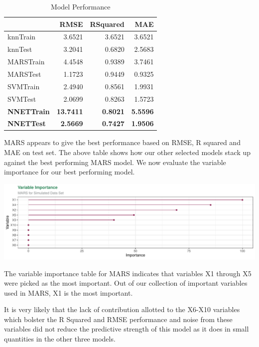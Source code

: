 \documentclass[]{report}
\begin{document}
\begin{table}[H]

\caption{\label{tab:unnamed-chunk-1}Model Performance}
\centering
\begin{tabular}[t]{l|r|r|r}
\hline
\textbf{ } & \textbf{RMSE} & \textbf{RSquared} & \textbf{MAE}\\
\hline
\rowcolor{gray!6}  knnTrain & 3.6521 & 3.6521 & 3.6521\\
\hline
knnTest & 3.2041 & 0.6820 & 2.5683\\
\hline
\rowcolor{gray!6}  MARSTrain & 4.4548 & 0.9389 & 3.7461\\
\hline
MARSTest & 1.1723 & 0.9449 & 0.9325\\
\hline
\rowcolor{gray!6}  SVMTrain & 2.4940 & 0.8561 & 1.9931\\
\hline
SVMTest & 2.0699 & 0.8263 & 1.5723\\
\hline
\rowcolor{gray!6}  \rowcolor[HTML]{d9f2e6}  \textbf{NNETTrain} & \textbf{13.7411} & \textbf{0.8021} & \textbf{5.5596}\\
\hline
\rowcolor[HTML]{d9f2e6}  \textbf{NNETTest} & \textbf{2.5669} & \textbf{0.7427} & \textbf{1.9506}\\
\hline
\end{tabular}
\end{table}

MARS appears to give the best performance based on RMSE, R squared and
MAE on test set. The above table shows how our other selected models
stack up against the best performing MARS model. We now evaluate the
variable importance for our best performing model.

\includegraphics{Homework-Two_files/figure-latex/kj-7.2-4b-1.pdf}

The variable importance table for MARS indicates that variables X1
through X5 were picked as the most important. Out of our collection of
important variables used in MARS, X1 is the most important.

It is very likely that the lack of contribution allotted to the X6-X10
variables which bolster the R Squared and RMSE performance and noise
from these variables did not reduce the predictive strength of this
model as it does in small quantities in the other three models.
\end{document}
